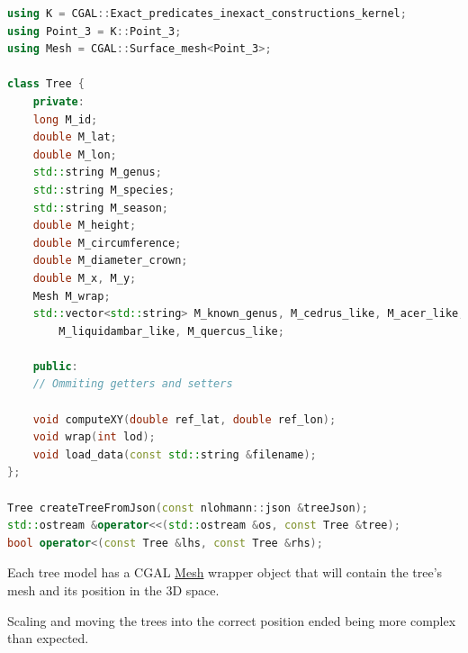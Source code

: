 \documentclass[12pt]{article}
\begin{document}
\begin{lstlisting}[language=C++]
using K = CGAL::Exact_predicates_inexact_constructions_kernel;
using Point_3 = K::Point_3;
using Mesh = CGAL::Surface_mesh<Point_3>;

class Tree {
    private:
    long M_id;
    double M_lat;
    double M_lon;
    std::string M_genus;
    std::string M_species;
    std::string M_season;
    double M_height;
    double M_circumference;
    double M_diameter_crown;
    double M_x, M_y;
    Mesh M_wrap;
    std::vector<std::string> M_known_genus, M_cedrus_like, M_acer_like,
        M_liquidambar_like, M_quercus_like;

    public:
    // Ommiting getters and setters

    void computeXY(double ref_lat, double ref_lon);
    void wrap(int lod);
    void load_data(const std::string &filename);
};

Tree createTreeFromJson(const nlohmann::json &treeJson);
std::ostream &operator<<(std::ostream &os, const Tree &tree);
bool operator<(const Tree &lhs, const Tree &rhs);
\end{lstlisting}

Each tree model has a CGAL \href{https://doc.cgal.org/latest/Surface_mesh/classCGAL_1_1Surface__mesh.html}{Mesh}
wrapper object that will contain the tree's
mesh and its position in the 3D space.

Scaling and moving the trees into the correct position ended being more complex
than expected.
\end{document}
